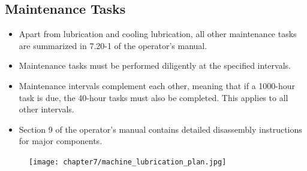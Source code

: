 \subsection*{Maintenance Tasks}
\begin{itemize}
    \item Apart from lubrication and cooling lubrication, all other maintenance tasks are summarized in 7.20-1 of the operator’s manual.
    \item Maintenance tasks must be performed diligently at the specified intervals.
    \item Maintenance intervals complement each other, meaning that if a 1000-hour task is due, the 40-hour tasks must also be completed. This applies to all other intervals.
    \item Section 9 of the operator's manual contains detailed disassembly instructions for major components.
\end{itemize}



\begin{figure}[H]
    \centering
    \texttt{[image: chapter7/machine\_lubrication\_plan.jpg]}
\end{figure}



